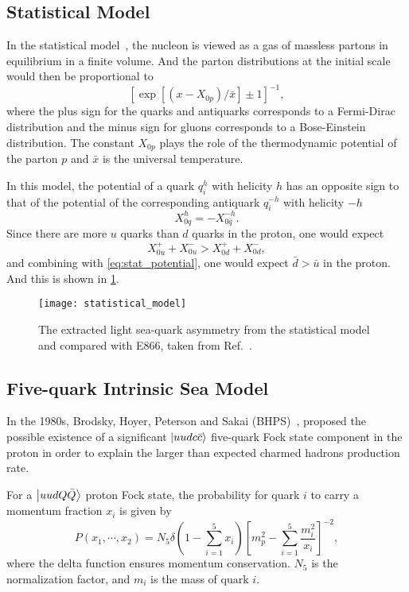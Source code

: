 \documentclass[../main.tex]{subfiles}
\begin{document}
\subsection{Statistical Model}
In the statistical model~\cite{bourrely2015}, the nucleon is viewed as a gas of massless partons in equilibrium in
a finite volume. And the parton distributions at the initial scale would then be proportional to
\begin{equation}
	\left[ \exp\left[\left(x-X_{0p}\right)/\bar{x}\right] \pm 1 \right]^{-1},
\end{equation}
where the plus sign for the quarks and antiquarks corresponds to a Fermi-Dirac distribution and
the minus sign for gluons corresponds to a Bose-Einstein distribution. The constant $X_{0p}$
plays the role of the thermodynamic potential of the parton $p$ and $\bar{x}$ is the universal
temperature.

In this model, the potential of a quark $q_i^h$ with helicity $h$ has an opposite sign to that of the
potential of the corresponding antiquark $q_i^{-h}$ with helicity $-h$
\begin{equation}
	X_{0q}^h = -X_{0\bar{q}}^{-h}.
	\label{eq:stat_potential}
\end{equation}
Since there are more $u$ quarks than $d$ quarks in the proton, one would expect
\begin{equation}
	X_{0u}^+ + X_{0u}^- > X_{0d}^+ + X_{0d}^-,
\end{equation}
and combining with \cref{eq:stat_potential}, one would expect $\bar{d} > \bar{u}$ in the proton.
And this is shown in \cref{fig:stat_dbub}.
\begin{figure}
	\centering
	\texttt{[image: statistical\_model]}
	\caption{The extracted light sea-quark asymmetry from the statistical model and compared with E866, taken
		from Ref.~\cite{soffer2019}.}
	\label{fig:stat_dbub}
\end{figure}


\subsection{Five-quark Intrinsic Sea Model}
In the 1980s, Brodsky, Hoyer, Peterson and Sakai (BHPS)~\cite{brodsky1980}, proposed
the possible existence of a significant $\ket{uudc\bar{c}}$ five-quark Fock state component
in the proton in order to explain the larger than expected charmed hadrons production rate.

For a $\ket{uudQ\bar{Q}}$ proton Fock state, the probability for quark $i$ to carry a momentum
fraction $x_i$ is given by
\begin{equation}
	P\left(x_1,\cdots,x_2\right)=N_5 \delta\left(1-\sum^5_{i=1}x_i\right)\left[m_p^2-\sum^5_{i=1}\frac{m_i^2}{x_i}\right]^{-2},
\end{equation}
where the delta function ensures momentum conservation. $N_5$ is the normalization factor,
and $m_i$ is the mass of quark $i$.
\end{document}
